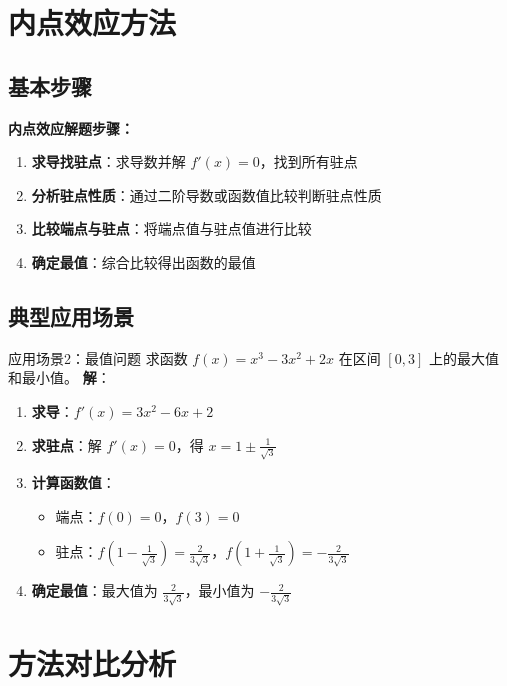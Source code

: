 \documentclass[a4paper,12pt]{ctexrep}
\begin{document}
\section{内点效应方法}

\subsection{基本步骤}

\textbf{内点效应解题步骤：}
\begin{enumerate}
    \item \textbf{求导找驻点}：求导数并解 $f'(x) = 0$，找到所有驻点
    \item \textbf{分析驻点性质}：通过二阶导数或函数值比较判断驻点性质
    \item \textbf{比较端点与驻点}：将端点值与驻点值进行比较
    \item \textbf{确定最值}：综合比较得出函数的最值
\end{enumerate}

\subsection{典型应用场景}

\begin{examplebox}{应用场景2：最值问题}
求函数 $f(x) = x^3 - 3x^2 + 2x$ 在区间 $[0, 3]$ 上的最大值和最小值。
\textbf{解}：
\begin{enumerate}
    \item \textbf{求导}：$f'(x) = 3x^2 - 6x + 2$
    \item \textbf{求驻点}：解 $f'(x) = 0$，得 $x = 1 \pm \frac{1}{\sqrt{3}}$
    \item \textbf{计算函数值}：
    \begin{itemize}
        \item 端点：$f(0) = 0$，$f(3) = 0$
        \item 驻点：$f(1 - \frac{1}{\sqrt{3}}) = \frac{2}{3\sqrt{3}}$，$f(1 + \frac{1}{\sqrt{3}}) = -\frac{2}{3\sqrt{3}}$
    \end{itemize}
    \item \textbf{确定最值}：最大值为 $\frac{2}{3\sqrt{3}}$，最小值为 $-\frac{2}{3\sqrt{3}}$
\end{enumerate}
\end{examplebox}

\section{方法对比分析}
\end{document}
